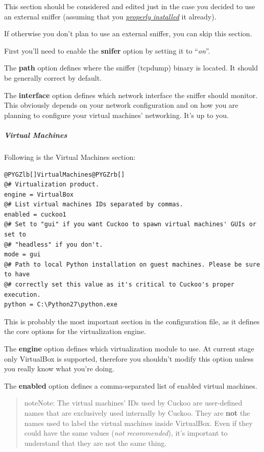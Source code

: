 \documentclass[letterpaper,10pt,english]{sphinxmanual}
\begin{document}
This section should be considered and edited just in the case you decided to use
an external sniffer (assuming that you {\hyperref[installation/host/requirements::doc]{\emph{properly installed}}}
it already).

If otherwise you don't plan to use an external sniffer, you can skip this section.

First you'll need to enable the \textbf{snifer} option by setting it to ``\emph{on}''.

The \textbf{path} option defines where the sniffer (tcpdump) binary is located. It
should be generally correct by default.

The \textbf{interface} option defines which network interface the sniffer should
monitor. This obviously depends on your network configuration and on how you
are planning to configure your virtual machines' networking. It's up to you.


\subparagraph{Virtual Machines}
\label{installation/host/configuration:virtual-machines}
Following is the Virtual Machines section:

\begin{Verbatim}[commandchars=@\[\]]
@PYGZlb[]VirtualMachines@PYGZrb[]
@# Virtualization product.
engine = VirtualBox
@# List virtual machines IDs separated by commas.
enabled = cuckoo1
@# Set to "gui" if you want Cuckoo to spawn virtual machines' GUIs or set to
@# "headless" if you don't.
mode = gui
@# Path to local Python installation on guest machines. Please be sure to have
@# correctly set this value as it's critical to Cuckoo's proper execution.
python = C:\Python27\python.exe
\end{Verbatim}

This is probably the most important section in the configuration file, as it
defines the core options for the virtualization engine.

The \textbf{engine} option defines which virtualization module to use. At current
stage only VirtualBox is supported, therefore you shouldn't modify this option
unless you really know what you're doing.

The \textbf{enabled} option defines a comma-separated list of enabled virtual
machines.
\begin{quote}

\begin{notice}{note}{Note:}
The virtual machines' IDs used by Cuckoo are user-defined names that are
exclusively used internally by Cuckoo. They are \textbf{not} the names used
to label the virtual machines inside VirtualBox. Even if they could have
the same values (\emph{not recommended}), it's important to understand that
they are not the same thing.
\end{notice}
\end{quote}
\end{document}
